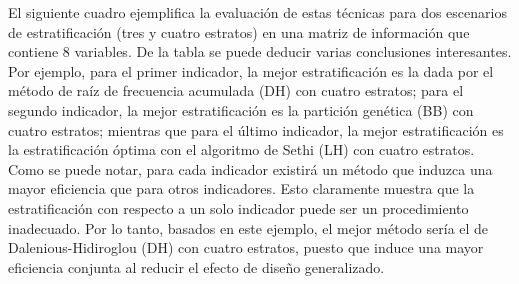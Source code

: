 \documentclass[
  12pt,
  spanish,
]{book}
\begin{document}
El siguiente cuadro ejemplifica la evaluación de estas técnicas para dos escenarios de estratificación (tres y cuatro estratos) en una matriz de información que contiene 8 variables. De la tabla se puede deducir varias conclusiones interesantes. Por ejemplo, para el primer indicador, la mejor estratificación es la dada por el método de raíz de frecuencia acumulada (DH) con cuatro estratos; para el segundo indicador, la mejor estratificación es la partición genética (BB) con cuatro estratos; mientras que para el último indicador, la mejor estratificación es la estratificación óptima con el algoritmo de Sethi (LH) con cuatro estratos. Como se puede notar, para cada indicador existirá un método que induzca una mayor eficiencia que para otros indicadores. Esto claramente muestra que la estratificación con respecto a un solo indicador puede ser un procedimiento inadecuado. Por lo tanto, basados en este ejemplo, el mejor método sería el de Dalenious-Hidiroglou (DH) con cuatro estratos, puesto que induce una mayor eficiencia conjunta al reducir el efecto de diseño generalizado.

\footnotesize
\end{document}
